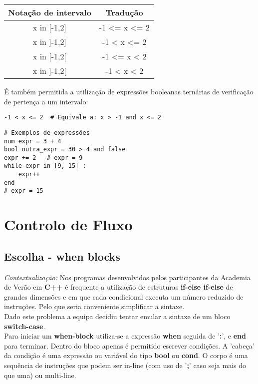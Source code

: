 \documentclass{report}
\begin{document}
\vspace{3mm}

\begin{center}
\begin{tabular}{| c | c |}
  \hline
  \textbf{Notação de intervalo} & \textbf{Tradução}\\
  \hline
  x in [-1,2] & -1 <= x <= 2\\
  \hline
  x in ]-1,2] & -1 < x <= 2\\
  \hline
  x in [-1,2[ & -1 <= x < 2\\
  \hline
  x in ]-1,2[ & -1 < x < 2\\
  \hline
  \end{tabular}
\end{center}

\vspace{4mm}

É também permitida a utilização de expressões booleanas ternárias de verificação de pertença a um intervalo:
\begin{verbatim}
-1 < x <= 2  # Equivale a: x > -1 and x <= 2
\end{verbatim}

\begin{verbatim}
# Exemplos de expressões
num expr = 3 + 4
bool outra_expr = 30 > 4 and false
expr += 2   # expr = 9
while expr in [9, 15[ :
    expr++
end
# expr = 15
\end{verbatim}

\section{Controlo de Fluxo}
\subsection{Escolha - when blocks}
\textit{Contextualização:} 
Nos programas desenvolvidos pelos participantes da Academia de Verão em \textbf{C++} é frequente a utilização de estruturas \textbf{if-else if-else} de grandes dimensões e em que cada condicional executa um número reduzido de instruções. Pelo que seria conveniente simplificar a sintaxe.\\ Dado este problema a equipa decidiu tentar emular a sintaxe de um bloco \textbf{switch-case}.\\

Para iniciar um \textbf{when-block} utiliza-se a expressão \textbf{when} seguida de '\textbf{:}', e \textbf{end} para terminar. Dentro do bloco apenas é permitido escrever condições. A 'cabeça' da condição é uma expressão ou variável do tipo \textbf{bool} ou \textbf{cond}. O corpo é uma sequência de instruções que podem ser in-line (com uso de '\textbf{;}' caso seja mais do que uma) ou multi-line.
\end{document}
